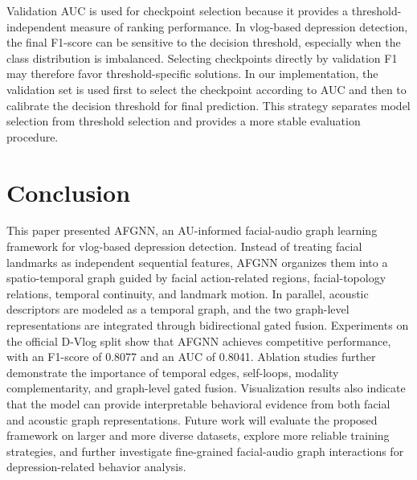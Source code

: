 \documentclass[conference]{IEEEtran}
\begin{document}
Validation AUC is used for checkpoint selection because it provides a threshold-independent measure of ranking performance. In vlog-based depression detection, the final F1-score can be sensitive to the decision threshold, especially when the class distribution is imbalanced. Selecting checkpoints directly by validation F1 may therefore favor threshold-specific solutions. In our implementation, the validation set is used first to select the checkpoint according to AUC and then to calibrate the decision threshold for final prediction. This strategy separates model selection from threshold selection and provides a more stable evaluation procedure.


\section{Conclusion}

This paper presented AFGNN, an AU-informed facial-audio graph learning framework for vlog-based depression detection. Instead of treating facial landmarks as independent sequential features, AFGNN organizes them into a spatio-temporal graph guided by facial action-related regions, facial-topology relations, temporal continuity, and landmark motion. In parallel, acoustic descriptors are modeled as a temporal graph, and the two graph-level representations are integrated through bidirectional gated fusion. Experiments on the official D-Vlog split show that AFGNN achieves competitive performance, with an F1-score of 0.8077 and an AUC of 0.8041. Ablation studies further demonstrate the importance of temporal edges, self-loops, modality complementarity, and graph-level gated fusion. Visualization results also indicate that the model can provide interpretable behavioral evidence from both facial and acoustic graph representations. 
Future work will evaluate the proposed framework on larger and more diverse datasets, explore more reliable training strategies, and further investigate fine-grained facial-audio graph interactions for depression-related behavior analysis.



\end{document}
